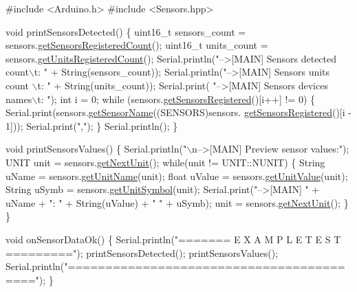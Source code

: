 \begin{DoxyCode}
\textcolor{preprocessor}{#include <Arduino.h>}
\textcolor{preprocessor}{#include <Sensors.hpp>}

\textcolor{keywordtype}{void} printSensorsDetected() \{
    uint16\_t sensors\_count =  sensors.\hyperlink{classSensors_ad8395e69cf5dcc68d0a8049ec7372a81}{getSensorsRegisteredCount}();
    uint16\_t units\_count   =  sensors.\hyperlink{classSensors_a1d723cdb619b2d61d3e4080182a12cbb}{getUnitsRegisteredCount}();
    Serial.println(\textcolor{stringliteral}{"-->[MAIN] Sensors detected count\(\backslash\)t: "} + String(sensors\_count));
    Serial.println(\textcolor{stringliteral}{"-->[MAIN] Sensors units count  \(\backslash\)t: "}  + String(units\_count));
    Serial.print(  \textcolor{stringliteral}{"-->[MAIN] Sensors devices names\(\backslash\)t: "});
    \textcolor{keywordtype}{int} i = 0;
    \textcolor{keywordflow}{while} (sensors.\hyperlink{classSensors_af9ee8f89e81d76a4c2b41ed6dc38f2f3}{getSensorsRegistered}()[i++] != 0) \{
        Serial.print(sensors.\hyperlink{classSensors_aa7ca70f31838cba52b96f76aa4a0d4a2}{getSensorName}((SENSORS)sensors.
      \hyperlink{classSensors_af9ee8f89e81d76a4c2b41ed6dc38f2f3}{getSensorsRegistered}()[i - 1]));
        Serial.print(\textcolor{stringliteral}{","});
    \}
    Serial.println();
\}

\textcolor{keywordtype}{void} printSensorsValues() \{
    Serial.println(\textcolor{stringliteral}{"\(\backslash\)n-->[MAIN] Preview sensor values:"});
    UNIT unit = sensors.\hyperlink{classSensors_ad33c76f341c86ac1900c5953fca9c0d1}{getNextUnit}();
    \textcolor{keywordflow}{while}(unit != UNIT::NUNIT) \{
        String uName = sensors.\hyperlink{classSensors_a4abb5d2a00d31a407e32cbdabe00b6eb}{getUnitName}(unit);
        \textcolor{keywordtype}{float} uValue = sensors.\hyperlink{classSensors_a7e75dd4e3f2e655a9961f57650cbf749}{getUnitValue}(unit);
        String uSymb = sensors.\hyperlink{classSensors_a365a45dc5c9ab598cfc206368579b94a}{getUnitSymbol}(unit);
        Serial.print(\textcolor{stringliteral}{"-->[MAIN] "} + uName + \textcolor{stringliteral}{": "} + String(uValue) + \textcolor{stringliteral}{" "} + uSymb);
        unit = sensors.\hyperlink{classSensors_ad33c76f341c86ac1900c5953fca9c0d1}{getNextUnit}();
    \}
\}

\textcolor{keywordtype}{void} onSensorDataOk() \{
    Serial.println(\textcolor{stringliteral}{"======= E X A M P L E   T E S T ========="});
    printSensorsDetected();
    printSensorsValues(); 
    Serial.println(\textcolor{stringliteral}{"========================================="});
\}


\end{DoxyCode}
